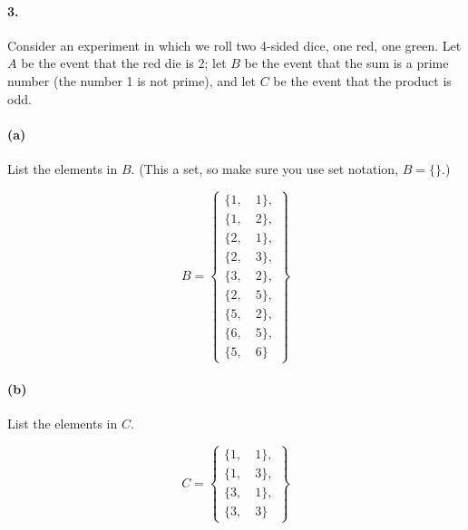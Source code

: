     \paragraph*{3.}
    Consider an experiment in which we roll two 4-sided dice, one red, one green. Let $A$ be the event that the red die is 2; let $B$ be the event that the sum is a prime number (the number 1 is not prime), and let $C$ be the event that the product is odd.

    \paragraph*{(a)}
    List the elements in $B$. (This a set, so make sure you use set notation, $B= \{\}$.)

    \begin{mdframed}
        \begin{equation}
            B =
            \left\{
                \begin{array}{l}
                    \{1, \quad 1\}, \\
                    \{1, \quad 2\}, \\
                    \{2, \quad 1\}, \\
                    \{2, \quad 3\}, \\
                    \{3, \quad 2\}, \\
                    \{2, \quad 5\}, \\
                    \{5, \quad 2\}, \\
                    \{6, \quad 5\}, \\
                    \{5, \quad 6\}
                \end{array}
            \right\}
        \end{equation}
    \end{mdframed}

    \paragraph*{(b)}
    List the elements in $C$.

    \begin{mdframed}
        \begin{equation}
            C =
            \left\{
                \begin{array}{l}
                    \{1, \quad 1\}, \\
                    \{1, \quad 3\}, \\
                    \{3, \quad 1\}, \\
                    \{3, \quad 3\}
                \end{array}
            \right\}
        \end{equation}
    \end{mdframed}

